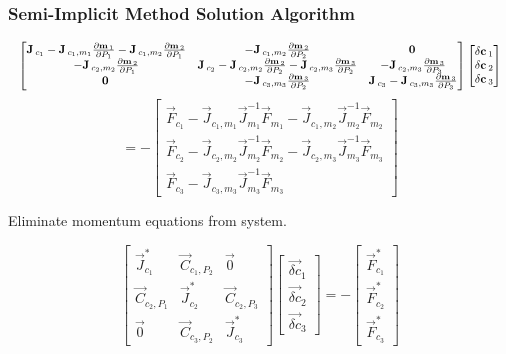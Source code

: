 \documentclass[compress,xcolor=table]{beamer}
\begin{document}
\begin{frame}
\frametitle{Semi-Implicit Method Solution Algorithm}

\begin{equation*}
\resizebox{1.0\textwidth}{!}{$
\begin{bmatrix} 
\vec{J}_{c_1} - \vec{J}_{c_1,m_1}\frac{\partial \vec{m}_1}{\partial P_1} - \vec{J}_{c_1,m_2}\frac{\partial \vec{m}_2}{\partial P_1} &
-\vec{J}_{c_1,m_2}\frac{\partial \vec{m}_2}{\partial P_2} &
\vec{0} \\
-\vec{J}_{c_2,m_2}\frac{\partial \vec{m}_2}{\partial P_1} & 
\vec{J}_{c_2} - \vec{J}_{c_2,m_2}\frac{\partial \vec{m}_2}{\partial P_2}-\vec{J}_{c_2,m_3}\frac{\partial \vec{m}_3}{\partial P_2} &
-\vec{J}_{c_2,m_3}\frac{\partial \vec{m}_3}{\partial P_3} \\
 \vec{0} &
-\vec{J}_{c_3,m_3}\frac{\partial \vec{m}_3}{\partial P_2} &
\vec{J}_{c_3} -\vec{J}_{c_3,m_3}\frac{\partial \vec{m}_3}{\partial P_3} 
\end{bmatrix}\begin{bmatrix}
\vec{\delta c}_{1} \\
\vec{\delta c}_{2} \\
\vec{\delta c}_{3}
\end{bmatrix}
$}
\end{equation*}
\begin{equation*}
= -\begin{bmatrix}
\vec{F}_{c_1} -
\vec{J}_{c_1,m_1}\vec{J}^{-1}_{m_1}\vec{F}_{m_1}-\vec{J}_{c_1,m_2}\vec{J}^{-1}_{m_2}\vec{F}_{m_2} \\
\vec{F}_{c_2} - 
\vec{J}_{c_2,m_2}\vec{J}^{-1}_{m_2}\vec{F}_{m_2}-\vec{J}_{c_2,m_3}\vec{J}^{-1}_{m_3}\vec{F}_{m_3} \\
\vec{F}_{c_3} - 
\vec{J}_{c_3,m_3}\vec{J}^{-1}_{m_3}\vec{F}_{m_3}
\end{bmatrix}
\end{equation*}

Eliminate momentum equations from system.

\begin{equation*}
\begin{bmatrix} 
\vec{J}^{*}_{c_1} & \vec{C}_{c_1,P_2} & \vec{0} \\
\vec{C}_{c_2,P_1} & \vec{J}^{*}_{c_2} & \vec{C}_{c_2,P_3} \\
\vec{0}           & \vec{C}_{c_3,P_2} & \vec{J}^{*}_{c_3}
\end{bmatrix} \begin{bmatrix}
\vec{\delta c}_{1} \\
\vec{\delta c}_{2} \\
\vec{\delta c}_{3}
\end{bmatrix}  = -\begin{bmatrix}
\vec{F}^{*}_{c_1} \\
\vec{F}^{*}_{c_2} \\
\vec{F}^{*}_{c_3}
\end{bmatrix}
\end{equation*}

\end{frame}
\end{document}

